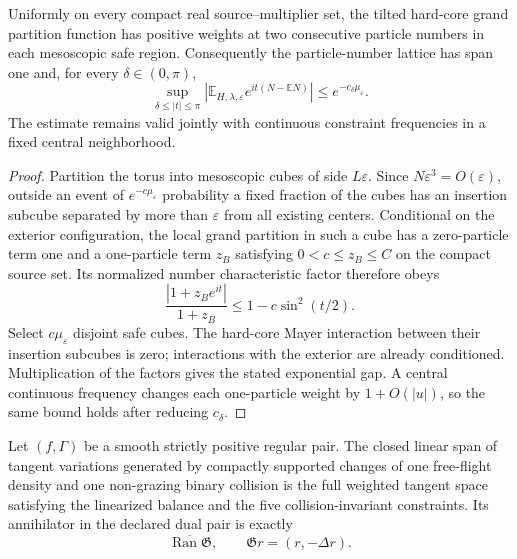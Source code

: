 \begin{lemma}
\label{lem:r3-b1-span-one}
Uniformly on every compact real source--multiplier set, the tilted hard-core
grand partition function has positive weights at two consecutive particle
numbers in each mesoscopic safe region.  Consequently the particle-number
lattice has span one and, for every \(\delta\in(0,\pi)\),
\[
 \sup_{\delta\le |t|\le\pi}
 \left|
 \mathbb E_{H,\lambda,\varepsilon}
 e^{it(N-\mathbb EN)}
 \right|
 \le e^{-c_\delta\mu_\varepsilon}.
\]
The estimate remains valid jointly with continuous constraint frequencies in
a fixed central neighborhood.
\end{lemma}

\begin{proof}
Partition the torus into mesoscopic cubes of side \(L\varepsilon\).  Since
\(N\varepsilon^3=O(\varepsilon)\), outside an event of
\(e^{-c\mu_\varepsilon}\) probability a fixed fraction of the cubes has an
insertion subcube separated by more than \(\varepsilon\) from all existing
centers.  Conditional on the exterior configuration, the local grand
partition in such a cube has a zero-particle term one and a one-particle term
\(z_B\) satisfying \(0<c\le z_B\le C\) on the compact source set.  Its
normalized number characteristic factor therefore obeys
\[
 \frac{|1+z_Be^{it}|}{1+z_B}
 \le1-c\sin^2(t/2).
\]
Select \(c\mu_\varepsilon\) disjoint safe cubes.  The hard-core Mayer
interaction between their insertion subcubes is zero; interactions with the
exterior are already conditioned.  Multiplication of the factors gives the
stated exponential gap.  A central continuous frequency changes each
one-particle weight by \(1+O(|u|)\), so the same bound holds after reducing
\(c_\delta\).
\end{proof}

\begin{lemma}
\label{lem:r3-b3-local-density}
Let \((f,\Gamma)\) be a smooth strictly positive regular pair.  The closed
linear span of tangent variations generated by compactly supported changes of
one free-flight density and one non-grazing binary collision is the full
weighted tangent space satisfying the linearized balance and the five
collision-invariant constraints.  Its annihilator in the declared dual pair
is exactly
\[
 \overline{\operatorname{Ran}\mathfrak G},
 \qquad
 \mathfrak G r=(r,-\Delta r).
\]
\end{lemma}

